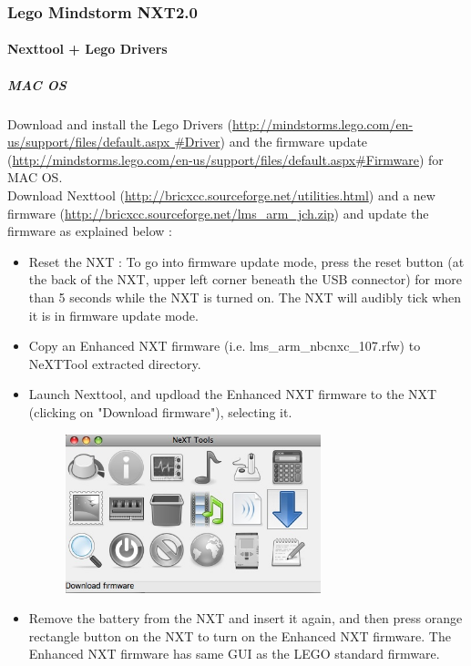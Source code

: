 
\subsubsection{Lego Mindstorm NXT2.0}

\paragraph{Nexttool + Lego Drivers}
\subparagraph{MAC OS}


Download and install the Lego Drivers (\href{http://mindstorms.lego.com/en-us/support/files/default.aspx#Driver}{http://mindstorms.lego.com/en-us/support/files/default.aspx
\#Driver}) and the firmware update (\href{http://mindstorms.lego.com/en-us/support/files/default.aspx#Firmware}{http://mindstorms.lego.com/en-us/support/files/default.aspx\#Firmware}) for MAC OS. \\
Download Nexttool (\href{http://bricxcc.sourceforge.net/utilities.html}{http://bricxcc.sourceforge.net/utilities.html}) and a new firmware (\href{http://bricxcc.sourceforge.net/lms_arm_jch.zip}{http://bricxcc.sourceforge.net/lms\_arm\_jch.zip}) and update the firmware as explained below :
\begin{itemize}
\item Reset the NXT : To go into firmware update mode, press the reset button (at the back of the NXT, upper left corner beneath the USB connector) for more than 5 seconds while the NXT is turned on. The NXT will audibly tick when it is in firmware update mode.
\item Copy an Enhanced NXT firmware (i.e. lms\_arm\_nbcnxc\_107.rfw) to NeXTTool extracted directory.
\item Launch Nexttool, and updload the Enhanced NXT firmware to the NXT (clicking on "Download firmware"), selecting it.
	\begin{figure}[h] %
   		\centering
		\includegraphics[width=0.7\textwidth]{pictures/firmware.jpg}
	\end{figure}
\item Remove the battery from the NXT and insert it again, and then press orange rectangle button on the NXT to turn on the Enhanced NXT firmware. The Enhanced NXT firmware has same GUI as the LEGO standard firmware.
\end{itemize}

